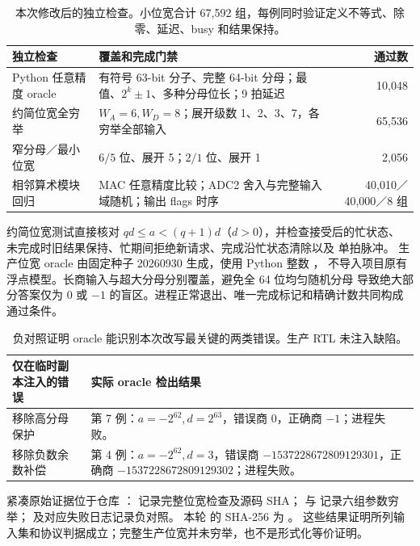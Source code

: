 \begin{table}[H]\centering\small
\begin{tabularx}{\textwidth}{p{43mm}Xr}\toprule
独立检查&覆盖和完成门禁&通过数\\\midrule
Python 任意精度 oracle&有符号 63-bit 分子、完整 64-bit 分母；最值、$2^k\pm1$、多种分母位长；9 拍延迟&10,048\\
约简位宽全穷举&$W_A=6,W_D=8$；展开级数 1、2、3、7，各穷举全部输入&65,536\\
窄分母／最小位宽&$6/5$ 位、展开 5；$2/1$ 位、展开 1&2,056\\
相邻算术模块回归&MAC 任意精度比较；ADC2 舍入与完整输入域随机；输出 flags 时序&40,010／40,000／8 组\\
\bottomrule\end{tabularx}
\caption{本次修改后的独立检查。小位宽合计 67,592 组，每例同时验证定义不等式、除零、延迟、busy 和结果保持。}
\end{table}

约简位宽测试直接核对 $qd\le a<(q+1)d$（$d>0$），并检查接受后的忙状态、
未完成时旧结果保持、忙期间拒绝新请求、完成沿忙状态清除以及  单拍脉冲。
生产位宽 oracle 由固定种子 20260930 生成，使用 Python 整数 \code{//}，
不导入项目原有浮点模型。长商输入与超大分母分别覆盖，避免全 64 位均匀随机分母
导致绝大部分答案仅为 0 或 $-1$ 的盲区。进程正常退出、唯一完成标记和精确计数共同构成通过条件。

\begin{table}[H]\centering\small
\begin{tabularx}{\textwidth}{>{\raggedright\arraybackslash}p{40mm}>{\raggedright\arraybackslash}X}\toprule
仅在临时副本注入的错误&实际 oracle 检出结果\\\midrule
移除高分母保护&第 7 例：$a=-2^{62},d=2^{63}$，错误商 0，正确商 $-1$；进程失败。\\
移除负数余数补偿&第 4 例：$a=-2^{62},d=3$，错误商 $-1537228672809129301$，正确商 $-1537228672809129302$；进程失败。\\
\bottomrule\end{tabularx}
\caption{负对照证明 oracle 能识别本次改写最关键的两类错误。生产 RTL 未注入缺陷。}
\end{table}

\begingroup\raggedright
紧凑原始证据位于仓库 ：
 记录完整位宽检查及源码 SHA；
 与  记录六组参数穷举；
 及对应失败日志记录负对照。
本轮  的 SHA-256 为
。
这些结果证明所列输入集和协议判据成立；完整生产位宽并未穷举，也不是形式化等价证明。\par\endgroup

